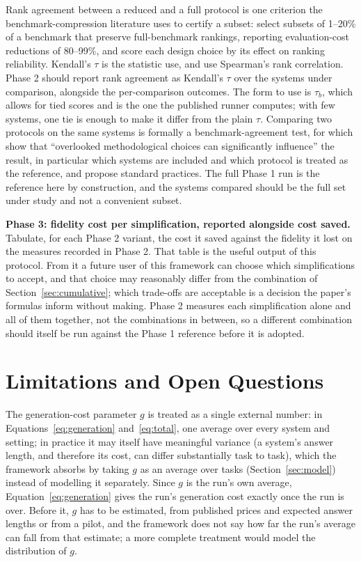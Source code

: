 \documentclass[11pt]{article}
\newcommand{\sectionbreak}{\par\ifdim\pagetotal<5.5\baselineskip\relax\else\clearpage\fi}
\begin{document}
Rank agreement between a
reduced and a full protocol is one criterion the benchmark-compression literature uses to
certify a subset: \citet{saranathan2025sublime} select subsets of 1--20\% of a benchmark that preserve full-benchmark rankings, reporting evaluation-cost reductions of 80--99\%, and \citet{perlitz2024efficient} score each design choice by its effect on ranking reliability. Kendall's $\tau$ is the statistic \citet{perlitz2024efficient} use, and \citet{saranathan2025sublime} use Spearman's rank correlation. Phase 2 should report rank agreement as Kendall's $\tau$ over the
systems under comparison, alongside the per-comparison outcomes. The form to use is $\tau_b$, which allows for tied scores and is the one the published runner computes; with few systems, one tie is enough to make it differ from the plain $\tau$. Comparing two protocols
on the same systems is formally a benchmark-agreement test, for which
\citet{perlitz2024benchbench} show that ``overlooked methodological choices can
significantly influence'' the result, in particular which systems are included and which protocol is treated as the reference, and propose standard practices. The full Phase 1 run is the reference here by construction, and the systems compared should be the full set under study and not a convenient subset.

\textbf{Phase 3: fidelity cost per simplification, reported alongside cost saved.} Tabulate, for each Phase 2 variant, the cost it saved against the fidelity it lost on the measures recorded in Phase 2. That table is the useful output of this protocol. From it a future user of this framework can choose which simplifications to accept, and that choice may reasonably differ from the combination of Section~\ref{sec:cumulative}; which trade-offs are acceptable is a decision the paper's formulas inform without making. Phase 2 measures each simplification alone and all of them together, not the combinations in between, so a different combination should itself be run against the Phase 1 reference before it is adopted.

\sectionbreak
\section{Limitations and Open Questions}
\label{sec:limitations}

The generation-cost parameter $g$ is treated as a single external number: in Equations~\ref{eq:generation} and~\ref{eq:total}, one average over every system and
setting; in practice it may itself have meaningful variance (a system's answer length, and
therefore its cost, can differ substantially task to task), which the framework absorbs by taking $g$ as an average over tasks (Section~\ref{sec:model}) instead of modelling it separately. Since $g$ is the run's own average, Equation~\ref{eq:generation} gives the run's generation cost exactly once the run is over. Before it, $g$ has to be estimated, from published prices and expected answer lengths or from a pilot, and the framework does not say how far the run's average can fall from that estimate; a more complete treatment would model the distribution of $g$.
\end{document}
